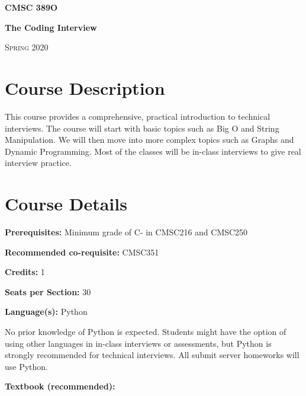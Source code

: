 \documentclass[12pt]{article}
\begin{document}
\thispagestyle{plain} %






\begin{center}
\bigskip
\large{\bf{CMSC 389O}}

\textbf{The Coding Interview}

\textsc{Spring 2020} \bigskip

\end{center}

\section*{Course Description}%
This course provides a comprehensive, practical introduction to technical interviews.
The course will start with basic topics such as Big O and String Manipulation.
We will then move into more complex topics such as Graphs and Dynamic Programming.
Most of the classes will be in-class interviews to give real interview practice.


\section*{Course Details}
\noindent\textbf{Prerequisites: }Minimum grade of C- in CMSC216 and CMSC250 \medskip

\noindent\textbf{Recommended co-requisite: }CMSC351 \medskip

\noindent\textbf{Credits: }1 \medskip

\noindent\textbf{Seats per Section: }30 \medskip

\noindent\textbf{Language(s): }Python

\noindent No prior knowledge of Python is expected. Students might have the option of using other languages in in-class interviews or assessments, but Python is strongly recommended for technical interviews. All submit server homeworks will use Python.
\medskip

\noindent\textbf{Textbook (recommended): }
\end{document}
